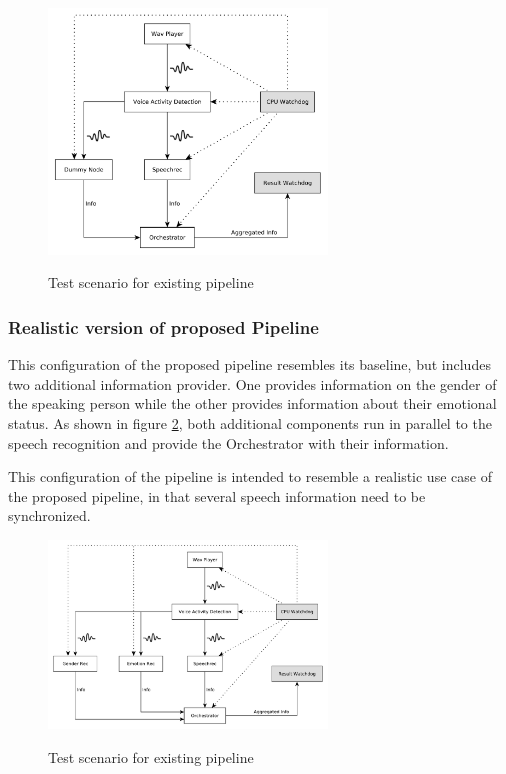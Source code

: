 \begin{figure}[]
	\centering
	\includegraphics[width=0.66\textwidth]{diagrams/eval_pipeline_3.pdf}
	\label{pic:eval_p3_diag}
	\caption{Test scenario for existing pipeline}
\end{figure}


\subsubsection{Realistic version of proposed Pipeline}
This configuration of the proposed pipeline resembles its baseline, but includes two additional information provider. 
One provides information on the gender of the speaking person while the other provides information about their emotional status.
As shown in figure \ref{pic:eval_p5_diag}, both additional components run in parallel to the speech recognition and provide the Orchestrator with their information.

This configuration of the pipeline is intended to resemble a realistic use case of the proposed pipeline, in that several speech information need to be synchronized.

\begin{figure}[]
	\centering
	\includegraphics[width=0.66\textwidth]{diagrams/eval_pipeline_5.pdf}
	\label{pic:eval_p5_diag}
	\caption{Test scenario for existing pipeline}
\end{figure}

